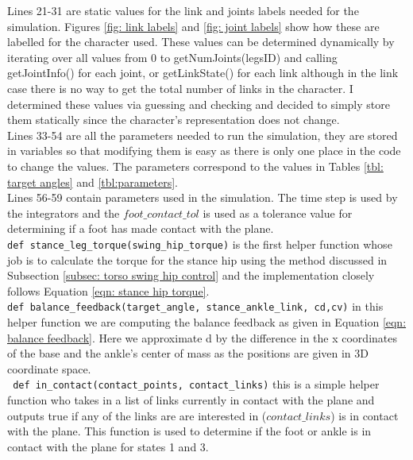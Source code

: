 \documentclass[12pt, a4paper]{article}
\begin{document}
Lines 21-31 are static values for the link and joints labels needed for the simulation. Figures \ref{fig: link labels} and \ref{fig: joint labels} show how these are labelled for the character used. These values can be determined dynamically by iterating over all values from 0 to getNumJoints(legsID) and calling getJointInfo() for each joint, or getLinkState() for each link although in the link case there is no way to get the total number of links in the character. I determined these values via guessing and checking and decided to simply store them statically since the character's representation does not change. \\

Lines 33-54 are all the parameters needed to run the simulation, they are stored in variables so that modifying them is easy as there is only one place in the code to change the values. The parameters correspond to the values in Tables \ref{tbl: target angles} and \ref{tbl:parameters}.\\

Lines 56-59 contain parameters used in the simulation. The time step is used by the integrators and the $foot\_contact\_tol$ is used as a tolerance value for determining if a foot has made contact with the plane.\\

\verb;def stance_leg_torque(swing_hip_torque); is the first helper function whose job is to calculate the torque for the stance hip using the method discussed in Subsection \ref{subsec: torso swing hip control} and the implementation closely follows Equation \ref{eqn: stance hip torque}. \\

\verb;def balance_feedback(target_angle, stance_ankle_link, cd,cv); in this helper function we are computing the balance feedback as given in Equation \ref{eqn: balance feedback}. Here we approximate d by the difference in the x coordinates of the base and the ankle's center of mass as the positions are given in 3D coordinate space. \\

\verb; def in_contact(contact_points, contact_links); this is a simple helper function who takes in a list of links currently in contact with the plane and outputs true if any of the links are are interested in ($contact\_links$) is in contact with the plane. This function is used to determine if the foot or ankle is in contact with the plane for states 1 and 3.\\
\end{document}
